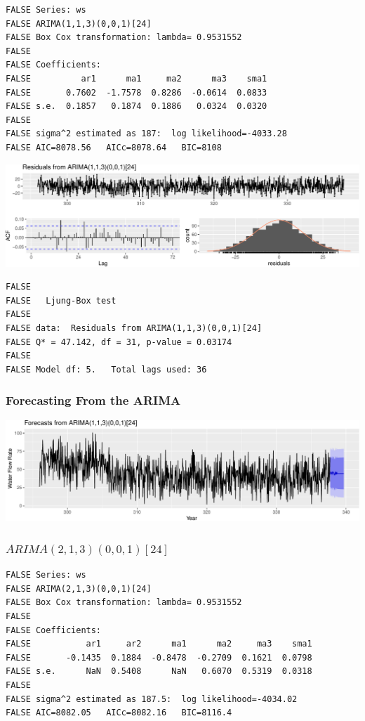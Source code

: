 \documentclass[openany]{book}
\begin{document}
\begin{verbatim}
FALSE Series: ws 
FALSE ARIMA(1,1,3)(0,0,1)[24] 
FALSE Box Cox transformation: lambda= 0.9531552 
FALSE 
FALSE Coefficients:
FALSE          ar1      ma1     ma2      ma3    sma1
FALSE       0.7602  -1.7578  0.8286  -0.0614  0.0833
FALSE s.e.  0.1857   0.1874  0.1886   0.0324  0.0320
FALSE 
FALSE sigma^2 estimated as 187:  log likelihood=-4033.28
FALSE AIC=8078.56   AICc=8078.64   BIC=8108
\end{verbatim}

\includegraphics{Part-C-BP_files/figure-latex/unnamed-chunk-9-1.pdf}

\begin{verbatim}
FALSE 
FALSE   Ljung-Box test
FALSE 
FALSE data:  Residuals from ARIMA(1,1,3)(0,0,1)[24]
FALSE Q* = 47.142, df = 31, p-value = 0.03174
FALSE 
FALSE Model df: 5.   Total lags used: 36
\end{verbatim}

\hypertarget{forecasting-from-the-arima}{%
\subsubsection{Forecasting From the
ARIMA}\label{forecasting-from-the-arima}}

\includegraphics{Part-C-BP_files/figure-latex/unnamed-chunk-10-1.pdf}

\hypertarget{arima21300124}{%
\subsubsection{\texorpdfstring{\(ARIMA(2,1,3)(0,0,1)[24]\)}{ARIMA(2,1,3)(0,0,1){[}24{]}}}\label{arima21300124}}

\begin{verbatim}
FALSE Series: ws 
FALSE ARIMA(2,1,3)(0,0,1)[24] 
FALSE Box Cox transformation: lambda= 0.9531552 
FALSE 
FALSE Coefficients:
FALSE           ar1     ar2      ma1      ma2     ma3    sma1
FALSE       -0.1435  0.1884  -0.8478  -0.2709  0.1621  0.0798
FALSE s.e.      NaN  0.5408      NaN   0.6070  0.5319  0.0318
FALSE 
FALSE sigma^2 estimated as 187.5:  log likelihood=-4034.02
FALSE AIC=8082.05   AICc=8082.16   BIC=8116.4
\end{verbatim}
\end{document}
